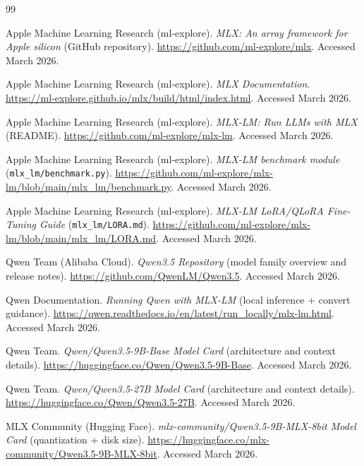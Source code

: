 \documentclass[11pt]{article}
\begin{document}
\begin{thebibliography}{99}

Apple Machine Learning Research (ml-explore).
\textit{MLX: An array framework for Apple silicon} (GitHub repository).
\url{https://github.com/ml-explore/mlx}.
Accessed March 2026.

Apple Machine Learning Research (ml-explore).
\textit{MLX Documentation}.
\url{https://ml-explore.github.io/mlx/build/html/index.html}.
Accessed March 2026.

Apple Machine Learning Research (ml-explore).
\textit{MLX-LM: Run LLMs with MLX} (README).
\url{https://github.com/ml-explore/mlx-lm}.
Accessed March 2026.

Apple Machine Learning Research (ml-explore).
\textit{MLX-LM benchmark module} (\texttt{mlx\_lm/benchmark.py}).
\url{https://github.com/ml-explore/mlx-lm/blob/main/mlx_lm/benchmark.py}.
Accessed March 2026.

Apple Machine Learning Research (ml-explore).
\textit{MLX-LM LoRA/QLoRA Fine-Tuning Guide} (\texttt{mlx\_lm/LORA.md}).
\url{https://github.com/ml-explore/mlx-lm/blob/main/mlx_lm/LORA.md}.
Accessed March 2026.

Qwen Team (Alibaba Cloud).
\textit{Qwen3.5 Repository} (model family overview and release notes).
\url{https://github.com/QwenLM/Qwen3.5}.
Accessed March 2026.

Qwen Documentation.
\textit{Running Qwen with MLX-LM} (local inference + convert guidance).
\url{https://qwen.readthedocs.io/en/latest/run_locally/mlx-lm.html}.
Accessed March 2026.

Qwen Team.
\textit{Qwen/Qwen3.5-9B-Base Model Card} (architecture and context details).
\url{https://huggingface.co/Qwen/Qwen3.5-9B-Base}.
Accessed March 2026.

Qwen Team.
\textit{Qwen/Qwen3.5-27B Model Card} (architecture and context details).
\url{https://huggingface.co/Qwen/Qwen3.5-27B}.
Accessed March 2026.

MLX Community (Hugging Face).
\textit{mlx-community/Qwen3.5-9B-MLX-8bit Model Card} (quantization + disk size).
\url{https://huggingface.co/mlx-community/Qwen3.5-9B-MLX-8bit}.
Accessed March 2026.

\end{thebibliography}
\end{document}
